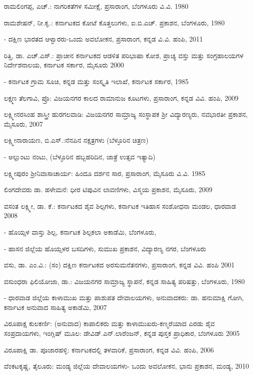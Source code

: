 \noindent
ರಾಮಲಿಂಗಪ್ಪ, ಎಚ್​.: ನಾಗರಿಕತೆಗಳ ಸಮೀಕ್ಷೆ, ಪ್ರಸಾರಾಂಗ, ಬೆಂಗಳೂರು ವಿ.ವಿ. 1980

\noindent
ರಾಮಶೇಷನ್​, ನೀ.ಕೃ.: ಕರ್ನಾಟಕದ ಕೋಟೆ ಕೊತ್ತಲುಗಳು, ಐ.ಬಿ.ಎಚ್​. ಪ್ರಕಾಶನ, ಬೆಂಗಳೂರು, 1980

- ದಕ್ಷಿಣ ಭಾರತದ ಆಳ್ವಾರರು-ಒಂದು ಅವಲೋಕನ, ಪ್ರಸಾರಾಂಗ, ಕನ್ನಡ ವಿ.ವಿ. ಹಂಪಿ, 2011

\noindent
ರಿತ್ತಿ, ಡಾ. ಎಚ್​.ಎಸ್​.: ಪ್ರಾಚೀನ ಕರ್ನಾಟಕದ ಆಡಳಿತ ಪರಿಭಾಷಾ ಕೋಶ, ಪ್ರಾಚ್ಯ ವಸ್ತು ಮತ್ತು ಸಂಗ್ರಹಾಲಯಗಳ ನಿರ್ದೇಶನಾಲಯ, ಕರ್ನಾಟಕ ಸರ್ಕಾರ, ಮೈಸೂರು 2000

- ಕರ್ನಾಟಕ ಗ್ರಾಮ ಸೂಚಿ, ಕನ್ನಡ ಮತ್ತು ಸಂಸ್ಕೃತಿ ಇಲಾಖೆ, ಕರ್ನಾಟಕ ಸರ್ಕಾರ, 1985

\noindent
ಲಕ್ಷ್ಮಣ ತೆಲಗಾವಿ, ಪ್ರೊ: ವಿಜಯನಗರ ಕಾಲದ ರಾಮಾನುಜ ಕೂಟಗಳು, ಪ್ರಸಾರಾಂಗ, ಕನ್ನಡ ವಿವಿ. ಹಂಪಿ, 2009

\noindent
ಲಕ್ಷ್ಮೀನರಸಿಂಹ ಶಾಸ್ತ್ರೀ ಹುರಗಲವಾಡಿ: ವಿಜಯನಗರ ಸಾಮ್ರಾಜ್ಯ ಸಂಸ್ಥಾಪಕ ಶ‍್ರೀ ವಿದ್ಯಾರಣ್ಯರು, ನವಭಾರತೀ ಪ್ರಕಾಶನ, ಮೈಸೂರು, 2007

\noindent
ಲಕ್ಷ್ಮೀನಾರಾಯಣ, ಬಿ.ಎಸ್​.:ನೆನಪಿನ ನಕ್ಷತ್ರಗಳು (ಬೆಳ್ಳೂರಿನ ಚಿತ್ರಣ)

- ಅಲ್ಲುಂಟು ನಂಟು, (ಬೆಳ್ಳೂರಿನ ಹಬ್ಬಹರಿದಿನ, ಜಾತ್ರೆ ಉತ್ಸವ ಇತ್ಯಾದಿ) 

\noindent
ಲಕ್ಷ್ಮೀಪುರಂ ಶ‍್ರೀನಿವಾಸಾಚಾರ್ಯ: ಹಿಂದೂ ದರ್ಶನ ಸಾರ, ಪ್ರಸಾರಾಂಗ, ಮೈಸೂರು ವಿ.ವಿ. 1985

\noindent
ಲಿಂಗದೇವರು ಡಾ. ಹಳೇಮನೆ: ಧೀರ ಟಿಪುವಿನ ಲಾವಣಿಗಳು, ವಿಸ್ಮಯ ಪ್ರಕಾಶನ, ಮೈಸೂರು, 2009

\noindent
ವಸಂತ ಲಕ್ಷ್ಮೀ, ಡಾ. ಕೆ.: ಕರ್ನಾಟಕದ ಶೈವ ಶಿಲ್ಪಗಳು, ಕರ್ನಾಟಕ ಇತಿಹಾಸ ಸಂಶೋಧನಾ ಮಂಡಲ, ಧಾರವಾಡ 2008

- ಹೊಯ್ಸಳ ವಾಸ್ತು ಶಿಲ್ಪ, ಕರ್ನಾಟಕ ಶಿಲ್ಪಕಲಾ ಅಕಾಡೆಮಿ, ಬೆಂಗಳೂರು, 

- ಹಾಸನ ಜಿಲ್ಲೆಯ ಹೊಯ್ಸಳರ ಬಸದಿಗಳು, ಸುಮುಖ ಪ್ರಕಾಶನ, ವಿದ್ಯಾರಣ್ಯ ನಗರ, ಬೆಂಗಳೂರು

\noindent
ವಸು, ಡಾ. ಎಂ.ವಿ.: (ಸಂ) ದಕ್ಷಿಣ ಕರ್ನಾಟಕದ ಅರಸುಮನೆತನಗಳು, ಪ್ರಸಾರಾಂಗ, ಕನ್ನಡ ವಿವಿ. ಹಂಪಿ 2001

\noindent
ವಸುಂಧರಾ ಫಿಲಿಯೋಜಾ, ಡಾ.: ವಿಜಯನಗರ ಸಾಮ್ರಾಜ್ಯ ಸ್ಥಾಪನೆ, ಕನ್ನಡ ಸಾಹಿತ್ಯ ಪರಿಷತ್ತು, ಬೆಂಗಳೂರು, 1980

- ಧಾರವಾಡ ಜಿಲ್ಲೆಯ ಕಾಳಾಮುಖ ಮತ್ತು ಪಾಶುಪತ ದೇವಾಲಯಗಳು, ಅನುವಾದಕರು: ಡಾ. ಹನುಮಾಕ್ಷಿ ಗೋಗಿ, ಕರ್ನಾಟಕ ಅನುವಾದ ಸಾಹಿತ್ಯ ಅಕಾಡೆಮಿ, 2007

\noindent
ವಿರೂಪಾಕ್ಷ ಕುಲಕರ್ಣಿ: (ಅನುವಾದ) ಕಾಪಾಲಿಕರು ಮತ್ತು ಕಾಳಾಮುಖರು-ಕಣ್ಮರೆಯಾದ ಎರಡು ಶೈವ ಸಂಪ್ರದಾಯಗಳು, ಇಂಗ್ಲಿಷ್​ ಮೂಲ: ಡೇವಿಡ್​.ಎನ್​.ಲಾರೆಂಜನ್​, ಕನ್ನಡ ಪುಸ್ತಕ ಪ್ರಾಧಿಕಾರ, ಬೆಂಗಳೂರು 2005

\noindent
ವಿರೂಪಾಕ್ಷಿ ಡಾ. ಪೂಜಾರಹಳ್ಳಿ: ಕರ್ನಾಟಕದಲ್ಲಿ ತಳವಾರಿಕೆ, ಪ್ರಸಾರಾಂಗ, ಕನ್ನಡ ವಿವಿ. ಹಂಪಿ, 2006

\noindent
ವೆಂಕಟಕೃಷ್ಣ, ತೈಲೂರು: ಮಂಡ್ಯ ಜಿಲ್ಲೆಯ ದೇವಾಲಯಗಳು- ಒಂದು ಅವಲೋಕನ, ಭಾನು ಪ್ರಕಾಶನ, ಮಂಡ್ಯ, 2010

